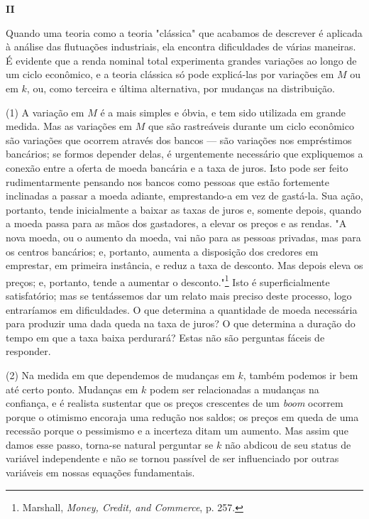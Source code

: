 \documentclass[12pt]{article}
\begin{document}
\begin{center}
\textbf{II}
\end{center}

Quando uma teoria como a teoria "clássica" que acabamos de descrever é aplicada à análise das flutuações industriais, ela encontra dificuldades de várias maneiras. É evidente que a renda nominal total experimenta grandes variações ao longo de um ciclo econômico, e a teoria clássica só pode explicá-las por variações em $M$ ou em $k$, ou, como terceira e última alternativa, por mudanças na distribuição.

(1) A variação em $M$ é a mais simples e óbvia, e tem sido utilizada em grande medida. Mas as variações em $M$ que são rastreáveis durante um ciclo econômico são variações que ocorrem através dos bancos — são variações nos empréstimos bancários; se formos depender delas, é urgentemente necessário que expliquemos a conexão entre a oferta de moeda bancária e a taxa de juros. Isto pode ser feito rudimentarmente pensando nos bancos como pessoas que estão fortemente inclinadas a passar a moeda adiante, emprestando-a em vez de gastá-la. Sua ação, portanto, tende inicialmente a baixar as taxas de juros e, somente depois, quando a moeda passa para as mãos dos gastadores, a elevar os preços e as rendas. "A nova moeda, ou o aumento da moeda, vai não para as pessoas privadas, mas para os centros bancários; e, portanto, aumenta a disposição dos credores em emprestar, em primeira instância, e reduz a taxa de desconto. Mas depois eleva os preços; e, portanto, tende a aumentar o desconto."\footnote{Marshall, \textit{Money, Credit, and Commerce}, p. 257.} Isto é superficialmente satisfatório; mas se tentássemos dar um relato mais preciso deste processo, logo entraríamos em dificuldades. O que determina a quantidade de moeda necessária para produzir uma dada queda na taxa de juros? O que determina a duração do tempo em que a taxa baixa perdurará? Estas não são perguntas fáceis de responder.

(2) Na medida em que dependemos de mudanças em $k$, também podemos ir bem até certo ponto. Mudanças em $k$ podem ser relacionadas a mudanças na confiança, e é realista sustentar que os preços crescentes de um \textit{boom} ocorrem porque o otimismo encoraja uma redução nos saldos; os preços em queda de uma recessão porque o pessimismo e a incerteza ditam um aumento. Mas assim que damos esse passo, torna-se natural perguntar se $k$ não abdicou de seu status de variável independente e não se tornou passível de ser influenciado por outras variáveis em nossas equações fundamentais.
\end{document}
